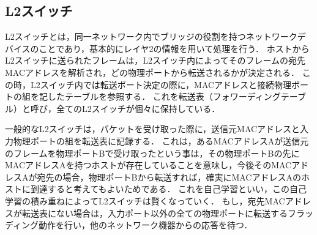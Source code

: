 \subsection{L2スイッチ}

L2スイッチとは，同一ネットワーク内でブリッジの役割を持つネットワークデバイスのことであり，基本的にレイヤ2の情報を用いて処理を行う\cite{masteringtcpip}．
ホストからL2スイッチに送られたフレームは，L2スイッチ内によってそのフレームの宛先MACアドレスを解析され，どの物理ポートから転送されるかが決定される．
この時，L2スイッチ内では転送ポート決定の際に，MACアドレスと接続物理ポートの組を記したテーブルを参照する．
これを転送表（フォワーディングテーブル）と呼び，全てのL2スイッチが個々に保持している．

一般的なL2スイッチは，パケットを受け取った際に，送信元MACアドレスと入力物理ポートの組を転送表に記録する．
これは，あるMACアドレスAが送信元のフレームを物理ポートBで受け取ったという事は，その物理ポートBの先にMACアドレスAを持つホストが存在していることを意味し，今後そのMACアドレスAが宛先の場合，物理ポートBから転送すれば，確実にMACアドレスAのホストに到達すると考えてもよいためである．
これを自己学習といい，この自己学習の積み重ねによってL2スイッチは賢くなっていく．
もし，宛先MACアドレスが転送表にない場合は，入力ポート以外の全ての物理ポートに転送するフラッディング動作を行い，他のネットワーク機器からの応答を待つ．